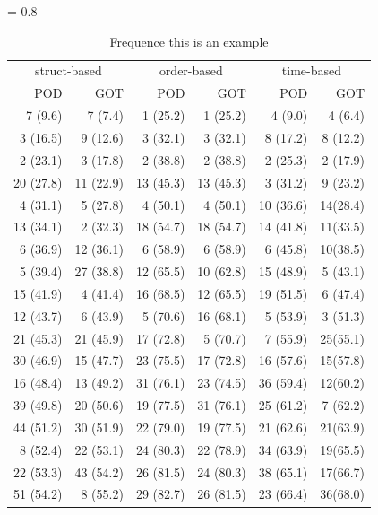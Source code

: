 \documentclass[conference]{IEEEtran}
\begin{document}
\begin{table}
 \begin{center}
   \tabcolsep = 0.8\tabcolsep
   \begin{tabular}{|rr|rr|rr|}
      \hline
      \multicolumn{2}{|c|}{struct-based} & \multicolumn{2}{|c|}{order-based} &  \multicolumn{2}{|c|}{time-based} \\
     	 POD & GOT 						& POD & GOT 		& POD & GOT\\
   \hline \hline
     7 (9.6)	& 7 (7.4)   		&  		1 (25.2) & 1 (25.2) &  4 (9.0) & 4 (6.4)\\    
     3 (16.5)& 9 (12.6)   	&  	3 (32.1) & 3 (32.1) &  8 (17.2) & 8 (12.2)\\ 
     2 (23.1)& 3 (17.8)   	&  	2 (38.8) & 2 (38.8) &  2 (25.3) & 2 (17.9)\\ 
     20 (27.8)& 11 (22.9)   &  	13 (45.3) & 13 (45.3) &  3 (31.2) & 9 (23.2)\\    
     4 (31.1)& 5 (27.8)   	&  	4 (50.1) & 4 (50.1) &  10 (36.6) & 14(28.4)\\ 
     13 (34.1)& 2 (32.3)   	&  	18 (54.7) & 18 (54.7) &  14 (41.8) & 11(33.5)\\ 
     6 (36.9)& 12 (36.1)   	&  	6 (58.9) & 6 (58.9) &  6 (45.8) & 10(38.5)\\    
     5 (39.4)& 27 (38.8)   	&	  	12 (65.5) & 10 (62.8) &  15 (48.9) & 5 (43.1)\\ 
     15 (41.9)& 4 (41.4)   	&  	16 (68.5) & 12 (65.5) &  19 (51.5) & 6 (47.4)\\  
     12 (43.7)& 6 (43.9)   	&  	5 (70.6) & 16 (68.1) &  5 (53.9) & 3 (51.3)\\    
     21 (45.3)& 21 (45.9)   	&  	17 (72.8) & 5 (70.7) &  7 (55.9) & 25(55.1)\\ 
     30 (46.9)& 15 (47.7)   	&  	23 (75.5) & 17 (72.8)&  16 (57.6) & 15(57.8)\\ 
     16 (48.4)& 13 (49.2)   	&  	31 (76.1) & 23 (74.5)&  36 (59.4) & 12(60.2)\\    
     39 (49.8)& 20 (50.6)   	&  	19 (77.5) & 31 (76.1) &  25 (61.2) & 7 (62.2)\\ 
     44 (51.2)& 30 (51.9)   	&  	22 (79.0) & 19 (77.5) &  21 (62.6) & 21(63.9)\\ 
     8 (52.4)& 22 (53.1)   	&	  	24 (80.3) & 22 (78.9) &  34 (63.9) & 19(65.5)\\    
     22 (53.3)& 43 (54.2)   	&  	26 (81.5) & 24 (80.3) &  38 (65.1) & 17(66.7)\\ 
     51 (54.2)& 8 (55.2)   	&  	29 (82.7)& 26 (81.5) &  23 (66.4) & 36(68.0)\\          
   \hline
   \end{tabular}
\label{tab:table}
 \end{center}
 \caption{Frequence this is an example}
\end{table}
\end{document}
